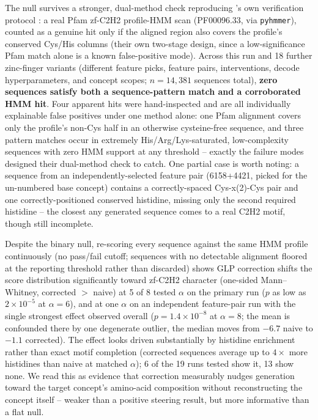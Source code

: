 \documentclass{article}
\begin{document}
The null survives a stronger, dual-method check reproducing \cite{villegas2025plmsae}'s own
verification protocol \cite{sathyaseelan2023znfprot}: a real Pfam zf-C2H2 profile-HMM scan
(PF00096.33, via \texttt{pyhmmer}), counted as a genuine hit only if the aligned region also
covers the profile's conserved Cys/His columns (their own two-stage design, since a
low-significance Pfam match alone is a known false-positive mode). Across this run and 18
further zinc-finger variants (different feature picks, feature pairs, interventions, decode
hyperparameters, and concept scopes; $n{=}14{,}381$ sequences total), \textbf{zero sequences
satisfy both a sequence-pattern match and a corroborated HMM hit}. Four apparent hits were hand-inspected and are all individually
explainable false positives under one method alone: one Pfam alignment covers only the
profile's non-Cys half in an otherwise cysteine-free sequence, and three pattern matches occur
in extremely His/Arg/Lys-saturated, low-complexity sequences with zero HMM support at any
threshold -- exactly the failure modes \cite{sathyaseelan2023znfprot} designed their
dual-method check to catch. One partial case is worth noting: a sequence from an
independently-selected feature pair (6158+4421, picked for the un-numbered base concept)
contains a correctly-spaced Cys-x(2)-Cys pair and one correctly-positioned conserved
histidine, missing only the second required histidine -- the closest any generated sequence
comes to a real C2H2 motif, though still incomplete.

Despite the binary null, re-scoring every sequence against the same HMM profile continuously
(no pass/fail cutoff; sequences with no detectable alignment floored at the reporting
threshold rather than discarded) shows GLP correction shifts the score distribution
significantly toward zf-C2H2 character (one-sided Mann--Whitney, corrected $>$ naive) at 5 of
8 tested $\alpha$ on the primary run ($p$ as low as $2\times10^{-5}$ at $\alpha{=}6$), and at
one $\alpha$ on an independent feature-pair run with the single strongest effect observed
overall ($p{=}1.4\times10^{-8}$ at $\alpha{=}8$; the mean is confounded there by one degenerate
outlier, the median moves from $-6.7$ naive to $-1.1$ corrected). The effect looks driven
substantially by histidine enrichment rather than exact motif completion (corrected sequences
average up to $4\times$ more histidines than naive at matched $\alpha$); 6 of the 19 runs
tested show it, 13 show none. We read this as evidence that correction measurably nudges
generation toward the target concept's amino-acid composition without reconstructing the
concept itself -- weaker than a positive steering result, but more informative than a flat
null.
\end{document}
